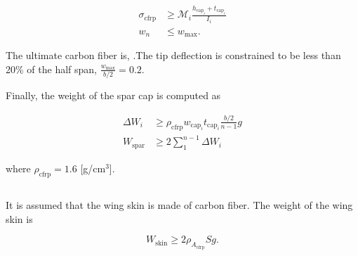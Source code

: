 \begin{align}
    \label{e:stresscont}
    \sigma_{\text{cfrp}} &\geq \mathcal{M}_i \frac{h_{\text{cap}_i}+t_{\text{cap}_i}}{I_i}\\
    \label{e:defcont}
    w_n &\leq w_{\text{max}}.
\end{align}

The ultimate \DIFdelbegin {}\DIFdelend \DIFaddbegin {}\DIFaddend carbon fiber is, \DIFdelbegin {}\DIFdelend \DIFaddbegin {}\DIFaddend [MPa].\DIFdelbegin {}\DIFdelend \DIFaddbegin {}\DIFaddend The tip deflection is constrained to be less than 20\% of the half span, $\frac{w_{\text{max}}}{b/2} = 0.2$.

Finally, the weight of the spar cap is computed as

\begin{align}
    \label{e:sparmass}
    \Delta W_i &\geq \rho_{\text{cfrp}} w_{\text{cap}_i}t_{\text{cap}_i} \frac{b/2}{n-1}g \\
    \label{e:sparmasssum}
    W_{\text{spar}} &\geq 2 \sum\limits_{1}^{n-1} \Delta W_i
\end{align}

where $\rho_{\text{cfrp}} = 1.6$ [g/cm$^3$].\DIFdelbegin {}\DIFdelend \DIFaddbegin {}\DIFaddend 

\DIFdelbegin \subsection{}
\addtocounter{subsection}{-1}%
\DIFdelend %

\DIFaddbegin \subsubsection{}

\DIFaddend It is assumed that the wing skin is made of carbon fiber.  The weight of the wing skin is 

\begin{equation}
    \label{e:wingskinweight}
    W_{\text{skin}} \geq 2 \rho_{A_{\text{cfrp}}} S g.
\end{equation}

